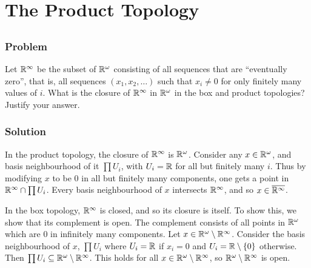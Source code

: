 \setcounter{section}{18} %
\section{The Product Topology}
\label{sec-topspace-product}
 
\setcounter{subsection}{6} %
\subsection{}

\subsubsection{Problem}
Let $\mathbb R^\infty$ be the subset of $\mathbb R^\omega$ consisting of all sequences that are ``eventually zero'', that is, all sequences $(x_1, x_2, \ldots)$ such that $x_i \neq 0$ for only finitely many values of $i$. What is the closure of $\mathbb R^\infty$ in $\mathbb R^\omega$ in the box and product topologies? Justify your answer.

\subsubsection{Solution}
In the product topology, the closure of $\mathbb R^\infty$ is $\mathbb R^\omega$. Consider any $x \in \mathbb R^\omega$, and basis neighbourhood of it $\prod U_i$, with $U_i = \mathbb R$ for all but finitely many $i$. Thus by modifying $x$ to be $0$ in all but finitely many components, one gets a point in $\mathbb R^\infty \cap \prod U_i$. Every basis neighbourhood of $x$ intersects $\mathbb R^\infty$, and so $x \in \overline{\mathbb R^\infty}$.

In the box topology, $\mathbb R^\infty$ is closed, and so its closure is itself. To show this, we show that its complement is open. The complement consists of all points in $\mathbb R^\omega$ which are $0$ in infinitely many components. Let $x \in \mathbb R^\omega \setminus \mathbb R^\infty$. Consider the basis neighbourhood of $x$, $\prod U_i$ where $U_i = \mathbb R$ if $x_i = 0$ and $U_i = \mathbb R \setminus \{0\}$ otherwise. Then $\prod U_i \subseteq \mathbb R^\omega \setminus \mathbb R^\infty$. This holds for all $x \in \mathbb R^\omega \setminus \mathbb R^\infty$, so $\mathbb R^\omega \setminus \mathbb R^\infty$ is open.
